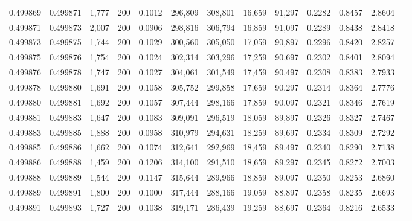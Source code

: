 \begin{tabular}{rrrrrrrrrrrrr}
0.499869 & 0.499871 &  1,777 & 200 &                                     0.1012 & 296,809 & 308,801 &  16,659 &  91,297 & 0.2282 & 0.8457 & 2.8604 \\
0.499871 & 0.499873 &  2,007 & 200 &                                     0.0906 & 298,816 & 306,794 &  16,859 &  91,097 & 0.2289 & 0.8438 & 2.8418 \\
0.499873 & 0.499875 &  1,744 & 200 &                                     0.1029 & 300,560 & 305,050 &  17,059 &  90,897 & 0.2296 & 0.8420 & 2.8257 \\
0.499875 & 0.499876 &  1,754 & 200 &                                     0.1024 & 302,314 & 303,296 &  17,259 &  90,697 & 0.2302 & 0.8401 & 2.8094 \\
0.499876 & 0.499878 &  1,747 & 200 &                                     0.1027 & 304,061 & 301,549 &  17,459 &  90,497 & 0.2308 & 0.8383 & 2.7933 \\
0.499878 & 0.499880 &  1,691 & 200 &                                     0.1058 & 305,752 & 299,858 &  17,659 &  90,297 & 0.2314 & 0.8364 & 2.7776 \\
0.499880 & 0.499881 &  1,692 & 200 &                                     0.1057 & 307,444 & 298,166 &  17,859 &  90,097 & 0.2321 & 0.8346 & 2.7619 \\
0.499881 & 0.499883 &  1,647 & 200 &                                     0.1083 & 309,091 & 296,519 &  18,059 &  89,897 & 0.2326 & 0.8327 & 2.7467 \\
0.499883 & 0.499885 &  1,888 & 200 &                                     0.0958 & 310,979 & 294,631 &  18,259 &  89,697 & 0.2334 & 0.8309 & 2.7292 \\
0.499885 & 0.499886 &  1,662 & 200 &                                     0.1074 & 312,641 & 292,969 &  18,459 &  89,497 & 0.2340 & 0.8290 & 2.7138 \\
0.499886 & 0.499888 &  1,459 & 200 &                                     0.1206 & 314,100 & 291,510 &  18,659 &  89,297 & 0.2345 & 0.8272 & 2.7003 \\
0.499888 & 0.499889 &  1,544 & 200 &                                     0.1147 & 315,644 & 289,966 &  18,859 &  89,097 & 0.2350 & 0.8253 & 2.6860 \\
0.499889 & 0.499891 &  1,800 & 200 &                                     0.1000 & 317,444 & 288,166 &  19,059 &  88,897 & 0.2358 & 0.8235 & 2.6693 \\
0.499891 & 0.499893 &  1,727 & 200 &                                     0.1038 & 319,171 & 286,439 &  19,259 &  88,697 & 0.2364 & 0.8216 & 2.6533 \\

\end{tabular}
